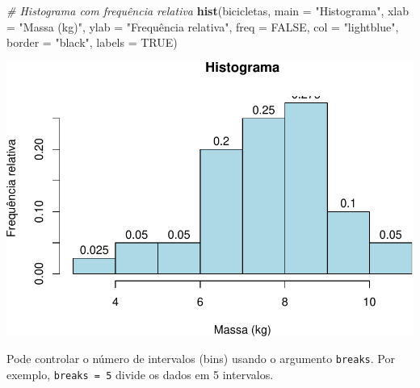\documentclass[
]{book}
\newenvironment{Shaded}{\begin{snugshade}}{\end{snugshade}}
\newcommand{\AttributeTok}[1]{\textcolor[rgb]{0.13,0.29,0.53}{#1}}
\newcommand{\CommentTok}[1]{\textcolor[rgb]{0.56,0.35,0.01}{\textit{#1}}}
\newcommand{\ConstantTok}[1]{\textcolor[rgb]{0.56,0.35,0.01}{#1}}
\newcommand{\DocumentationTok}[1]{\textcolor[rgb]{0.56,0.35,0.01}{\textbf{\textit{#1}}}}
\newcommand{\FunctionTok}[1]{\textcolor[rgb]{0.13,0.29,0.53}{\textbf{#1}}}
\newcommand{\NormalTok}[1]{#1}
\newcommand{\SpecialCharTok}[1]{\textcolor[rgb]{0.81,0.36,0.00}{\textbf{#1}}}
\newcommand{\StringTok}[1]{\textcolor[rgb]{0.31,0.60,0.02}{#1}}
\begin{document}
\begin{Shaded}
\end{Shaded}

\begin{Shaded}
\begin{Highlighting}[]
\CommentTok{\# Histograma com frequência relativa}
\FunctionTok{hist}\NormalTok{(bicicletas,}
  \AttributeTok{main =} \StringTok{"Histograma"}\NormalTok{,          }
  \AttributeTok{xlab =} \StringTok{"Massa (kg)"}\NormalTok{,          }
  \AttributeTok{ylab =} \StringTok{"Frequência relativa"}\NormalTok{,     }
  \AttributeTok{freq =} \ConstantTok{FALSE}\NormalTok{,}
  \AttributeTok{col =} \StringTok{"lightblue"}\NormalTok{,}
  \AttributeTok{border =} \StringTok{"black"}\NormalTok{,}
  \AttributeTok{labels =} \ConstantTok{TRUE}\NormalTok{)}
\end{Highlighting}
\end{Shaded}

\includegraphics{introR_files/figure-latex/unnamed-chunk-171-1.pdf}

Pode controlar o número de intervalos (bins) usando o argumento
\texttt{breaks}. Por exemplo, \texttt{breaks\ =\ 5} divide os dados em 5 intervalos.
\end{document}
